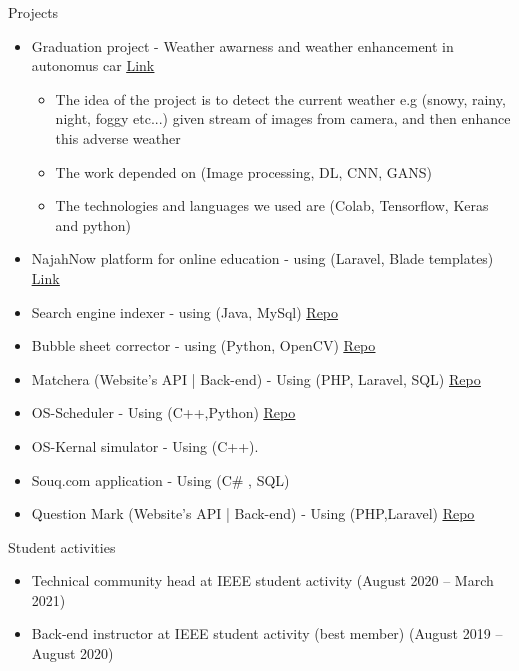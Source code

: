 \documentclass{resume}
\begin{document}
\clearpage

\begin{rSection}{Projects}
  \begin{itemize}
    \item Graduation project - Weather awarness and weather enhancement in autonomus car \hfill{\underline{\href{https://drive.google.com/file/d/11GYtO8znR4oq7MEnZ1taFSAtn_udwmGb/view}{Link}}}
          \begin{itemize}
            \item The idea of the project is to detect the current weather e.g (snowy, rainy, night, foggy etc...) given stream of images from camera, and then enhance this adverse weather
            \item The work depended on (Image processing, DL, CNN, GANS)
            \item The technologies and languages we used are (Colab, Tensorflow, Keras and python)
          \end{itemize}
    \item NajahNow platform for online education - using (Laravel, Blade templates) \hfill{\underline{\href{https://najahnow.net}{Link}}}
    \item Search engine indexer - using (Java, MySql) \hfill{\underline{\href{https://github.com/sofyanmahmoud0000/Jindexer}{Repo}}}
    \item Bubble sheet corrector  - using (Python, OpenCV) \hfill{\underline{\href{https://github.com/sofyanmahmoud0000/BSCorrector}{Repo}}}
    \item Matchera (Website's API | Back-end) - Using (PHP, Laravel, SQL) \hfill{\underline{\href{https://github.com/sofyanmahmoud0000/Matchera}{Repo}}}
    \item OS-Scheduler - Using (C++,Python) \hfill{\underline{\href{https://github.com/sofyanmahmoud0000/OS-Scheduler}{Repo}}}
    \item OS-Kernal simulator - Using (C++).
    \item Souq.com application - Using (C\# , SQL)
    \item Question Mark (Website's API | Back-end) - Using (PHP,Laravel)  \hfill{\underline{\href{https://github.com/sofyanmahmoud0000/questionmark}{Repo}}}
  \end{itemize}
\end{rSection}

\begin{rSection}{Student activities}
  \begin{itemize}
    \item Technical community head at IEEE student activity \hfill{(August 2020 – March 2021)}
    \item Back-end instructor at IEEE student activity (best member) \hfill{(August 2019 – August 2020)}
  \end{itemize}
\end{rSection}
\end{document}
